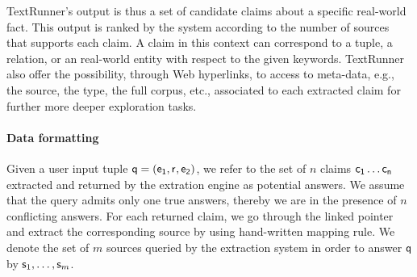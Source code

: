 TextRunner's output is thus a set of candidate claims about a specific real-world fact.
This output is ranked by the system according to the number of sources that supports each
claim. A claim in this context can correspond to a tuple, a relation, or an real-world entity 
with respect to the given keywords. TextRunner also offer the possibility, through Web hyperlinks, 
to access to meta-data, e.g., the source, the type, the full corpus, etc., associated to each extracted claim
for further more deeper exploration tasks. 

\paragraph*{Data formatting}
Given a user input tuple $\mathsf{q}=(\mathsf{e_{1}}, \mathsf{r}_{},\mathsf{e_{2}})$, we refer to the
set of $n$ claims $\mathsf{c_{1}}\ldots \mathsf{c_{n}}$ extracted and returned by the
extration engine as potential answers. 
We assume that the query admits only one true answers, thereby we are in the presence of
$n$ conflicting answers. For each returned claim, we go through the linked pointer and extract the
corresponding source by using hand-written mapping rule. We denote the set of $m$ sources queried by 
the extraction system in order to answer $\mathsf{q}$ by $\mathsf{s}_{1}, \ldots, \mathsf{s}_{m}$.